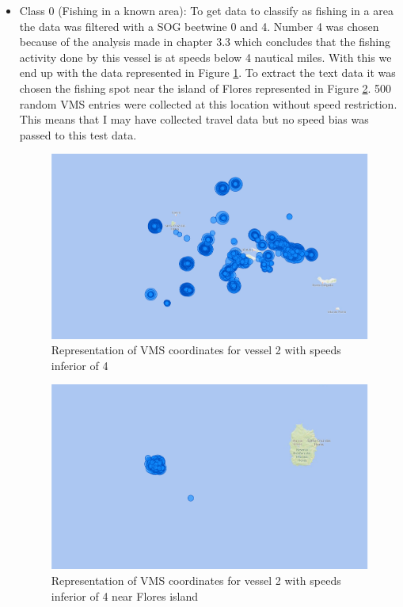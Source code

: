 \begin{itemize}
\item Class 0 (Fishing in a known area): To get data to classify as fishing in a area the data was filtered with a SOG beetwine 0 and 4. Number 4 was chosen because of the analysis made in chapter 3.3 which concludes that the fishing activity done by this vessel is at speeds below 4 nautical miles. With this we end up with the data represented in Figure \ref{fig:bi_2_all}. To extract the text data it was chosen the fishing spot near the island of Flores represented in Figure \ref{fig:bi_2_flores}. 500 random VMS entries were collected at this location without speed restriction. This means that I may have collected travel data but no speed bias was passed to this test data. 


\begin{figure}[H]
    \centering
    \includegraphics[width=0.8\linewidth]{Chapters/img/2fishingAll.pdf}
    \caption{Representation of VMS coordinates for vessel 2 with speeds inferior of 4 }
    \label{fig:bi_2_all}
\end{figure}

\begin{figure}[H]
    \centering
    \includegraphics[width=0.8\linewidth]{Chapters/img/2fishing.pdf}
    \caption{Representation of VMS coordinates for vessel 2 with speeds inferior of 4 near Flores island }
    \label{fig:bi_2_flores}
\end{figure}


\end{itemize}
